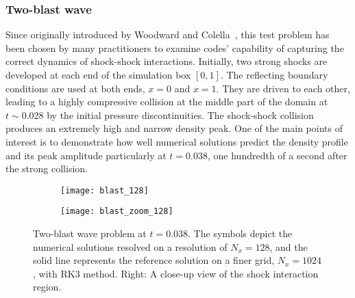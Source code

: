 \documentclass[times,preprint,3p]{elsarticle}
\begin{document}
\subsubsection{Two-blast wave}
Since originally introduced by Woodward and Colella~\cite{woodward1984numerical},
this test problem has been chosen
by many practitioners to
examine codes' capability of capturing the correct dynamics of
shock-shock interactions.
Initially, two strong shocks are developed at each end of the simulation box \( \left[ 0, 1 \right] \).
The reflecting boundary conditions are used at both ends, $x=0$ and $x=1$.
They are driven to each other,
leading to a highly compressive collision
at the middle part of the domain at $t\sim 0.028$ by the initial pressure discontinuities.
The shock-shock collision produces an extremely high and narrow density peak.
One of the main points of interest is to demonstrate how well numerical solutions
predict the density profile and its peak amplitude
particularly at \( t = 0.038 \),
one hundredth of a second after the strong collision.
%
\begin{figure}[ht!]
    \centering
    \begin{subfigure}{80mm}
        \centering
        \texttt{[image: blast\_128]}
    \end{subfigure}
    \begin{subfigure}{80mm}
        \centering
        \texttt{[image: blast\_zoom\_128]}
    \end{subfigure}
    \caption{Two-blast wave problem at \( t = 0.038 \).
        The symbols depict the numerical solutions resolved on
         a resolution of \( N_{x} = 128 \),
        and the solid line represents the reference solution on a finer grid, \( N_{x} = 1024 \),
        with RK3 method. Right: A close-up view of the shock interaction region.
    }\label{fig:1d-blast}
\end{figure}
\end{document}

